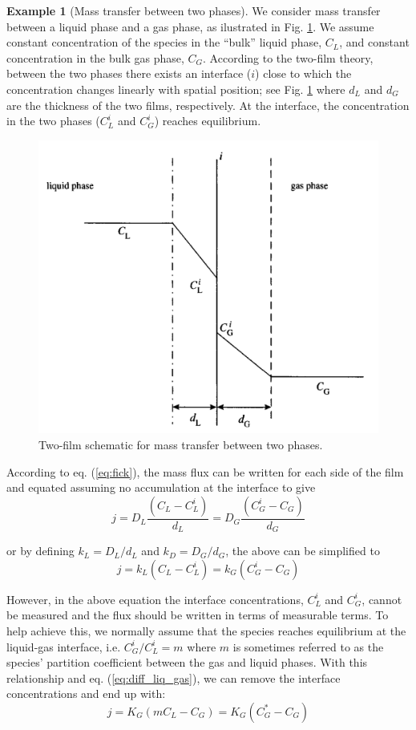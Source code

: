 \documentclass[a4paper,11pt]{article}
\theoremstyle{definition}
\newtheorem{exmp}{Example}[section]
\begin{document}
\begin{exmp}[Mass transfer between two phases]
\label{exmp:mass_transfer}
We consider mass transfer between a liquid phase and a gas phase, as ilustrated in Fig. \ref{fig:mass_transfer}.
We assume constant concentration of the species in the ``bulk'' liquid phase, $C_L$, and constant concentration in the bulk
gas phase, $C_G$. According to the two-film theory, between the two phases there exists an interface ($i$) close to which
the concentration changes linearly with spatial position; see Fig. \ref{fig:mass_transfer} 
where $d_L$ and $d_G$ are the thickness of the two films, respectively. At the interface, the concentration in the
two phases ($C_L^i$ and $C_G^i$) reaches equilibrium.

\begin{figure} [!h]
 \begin{center}
	\includegraphics[width=.45\textwidth]{mass_transfer}
 \end{center}
 \caption{Two-film schematic for mass transfer between two phases.}
 \label{fig:mass_transfer}
\end{figure}

According to eq. (\ref{eq:fick}), the mass flux can be written for each side of the film and equated assuming no
accumulation at the interface to give
\begin{equation}
	j = D_L \frac{ ( C_L - C_L^i ) } { d_L } = D_G \frac{ ( C_G^i - C_G ) } { d_G}
\end{equation}

\noindent or by defining $k_L = D_L/d_L$ and $k_D = D_G/d_G$, the above can be simplified to
\begin{equation} \label{eq:diff_liq_gas}
	j = k_L ( C_L - C_L^i ) = k_G ( C_G^i - C_G )
\end{equation}

\noindent However, in the above equation the interface concentrations, $C_L^i$ and $C_G^i$, cannot be measured
and the flux should be written in terms of measurable terms. To help achieve this, we normally assume that
the species reaches equilibrium at the liquid-gas interface, i.e. $C_G^i / C_L^i = m$ where $m$ is sometimes referred to
as the species' partition coefficient between the gas and liquid phases. With this relationship and eq. (\ref{eq:diff_liq_gas}),
we can remove the interface concentrations and end up with:
\begin{equation} \label{eq:diff_liq_gas_2}
	j = K_G ( m C_L - C_G ) = K_G ( C_G^* - C_G )
\end{equation}


\end{exmp}
\end{document}
